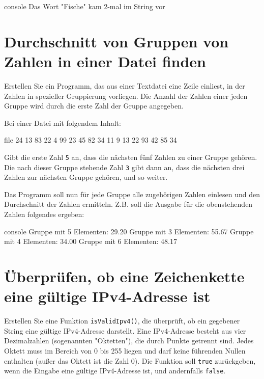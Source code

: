 \begin{mybox}[Bildschirmausgabe]{console}
Das Wort "Fische" kam 2-mal im String vor
\end{mybox}



\chapter{Durchschnitt von Gruppen von Zahlen in einer Datei finden}

\vspace{10pt}

Erstellen Sie ein Programm, das aus einer Textdatei eine Zeile einliest, in der
Zahlen in spezieller Gruppierung vorliegen. Die Anzahl der Zahlen einer jeden
Gruppe wird durch die erste Zahl der Gruppe angegeben.

Bei einer Datei mit folgendem Inhalt:

\begin{mybox}{file}
 24 13 83 22 4  99 23 45  82 34 11 9  13 22 93 42 85 34
\end{mybox}

Gibt die erste Zahl \texttt{5} an, dass die nächsten fünf Zahlen zu
einer Gruppe gehören. Die nach dieser Gruppe stehende Zahl \texttt{3}
gibt dann an, dass die nächsten drei Zahlen zur nächsten Gruppe gehören, und so
weiter.

Das Programm soll nun für jede Gruppe alle zugehörigen Zahlen einlesen und den
Durchschnitt der Zahlen ermitteln. Z.B. soll die Ausgabe für die obenstehenden
Zahlen folgendes ergeben:

\begin{mybox}[Bildschirmausgabe]{console}
Gruppe mit 5 Elementen: 29.20
Gruppe mit 3 Elementen: 55.67
Gruppe mit 4 Elementen: 34.00
Gruppe mit 6 Elementen: 48.17
\end{mybox}



\chapter{Überprüfen, ob eine Zeichenkette eine gültige IPv4-Adresse ist}

\vspace{10pt}

Erstellen Sie eine Funktion \texttt{isValidIpv4()}, die überprüft, ob ein
gegebener String eine gültige IPv4-Adresse darstellt. Eine IPv4-Adresse besteht
aus vier Dezimalzahlen (sogenannten "Oktetten"), die durch Punkte getrennt sind.
Jedes Oktett muss im Bereich von 0 bis 255 liegen und darf keine führenden
Nullen enthalten (außer das Oktett ist die Zahl 0). Die Funktion soll
\texttt{true} zurückgeben, wenn die Eingabe eine gültige IPv4-Adresse
ist, und andernfalls \texttt{false}.

